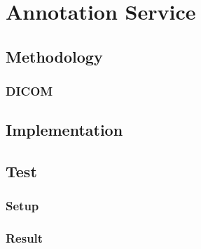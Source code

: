 \chapter{Annotation Service}

\section{Methodology}
\subsection{DICOM}
\section{Implementation}
\section{Test}
\subsection{Setup}
\subsection{Result}